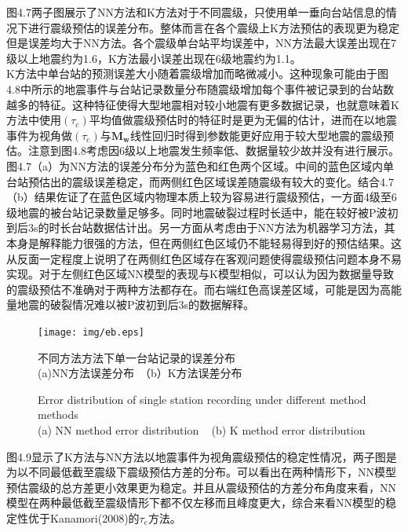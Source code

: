 \indent 图4.7两子图展示了NN方法和K方法对于不同震级，只使用单一垂向台站信息的情况下进行震级预估的误差分布。整体而言在各个震级上K方法预估的表现更为稳定但是误差均大于NN方法。各个震级单台站平均误差中，NN方法最大误差出现在7级以上地震约为1.6，K方法最小误差出现在6级地震约为1.1。\\
\indent K方法中单台站的预测误差大小随着震级增加而略微减小。这种现象可能由于图4.8中所示的地震事件与台站记录数量分布随震级增加每个事件被记录到的台站数越多的特征。这种特征使得大型地震相对较小地震有更多数据记录，也就意味着K方法中使用$\left(\tau_{\mathrm{c}}\right)$平均值做震级预估时的特征时是更为无偏的估计，进而在以地震事件为视角做$\left(\tau_{\mathrm{c}}\right)$与$\mathbf{M}_{\mathbf{w}}$线性回归时得到参数能更好应用于较大型地震的震级预估。注意到图4.8考虑因6级以上地震发生频率低、数据量较少故并没有进行展示。\\
\indent 图4.7（a）为NN方法的误差分布分为蓝色和红色两个区域。中间的蓝色区域内单台站预估出的震级误差稳定，而两侧红色区域误差随震级有较大的变化。结合4.7（b）结果佐证了在蓝色区域内物理本质上较为容易进行震级预估，一方面4级至6级地震的被台站记录数量足够多。同时地震破裂过程时长适中，能在较好被P波初到后3s的时长台站数据估计出。另一方面从考虑由于NN方法为机器学习方法，其本身是解释能力很强的方法，但在两侧红色区域仍不能轻易得到好的预估结果。这从反面一定程度上说明了在两侧红色区域存在客观问题使得震级预估问题本身不易实现。对于左侧红色区域NN模型的表现与K模型相似，可以认为因为数据量导致的震级预估不准确对于两种方法都存在。而右端红色高误差区域，可能是因为高能量地震的破裂情况难以被P波初到后3s的数据解释。\\
\begin{figure}[!h] 
\centering 
\texttt{[image: img/eb.eps]} 
\renewcommand{\figurename}{图} 
\caption{不同方法方法下单一台站记录的误差分布\\
(a)NN方法误差分布~（b）K方法误差分布} 
\addtocounter{figure}{-1} \vspace{-5pt} 
\renewcommand{\figurename}{Fig} 
\caption{Error distribution of single station recording under different method methods\\
(a) NN method error distribution ~ (b) K method error distribution} 
\renewcommand{\figurename}{图} 
\label{fig:network-device-influence.png} 
\end{figure}
\indent 图4.9显示了K方法与NN方法以地震事件为视角震级预估的稳定性情况，两子图是为以不同最低截至震级下震级预估方差的分布。可以看出在两种情形下，NN模型预估震级的总方差更小效果更为稳定。并且从震级预估的方差分布角度来看，NN模型在两种最低截至震级情形下都不仅左移而且峰度更大，综合来看NN模型的稳定性优于Kanamori(2008)的$\tau_{\mathrm{c}}$方法。\\

